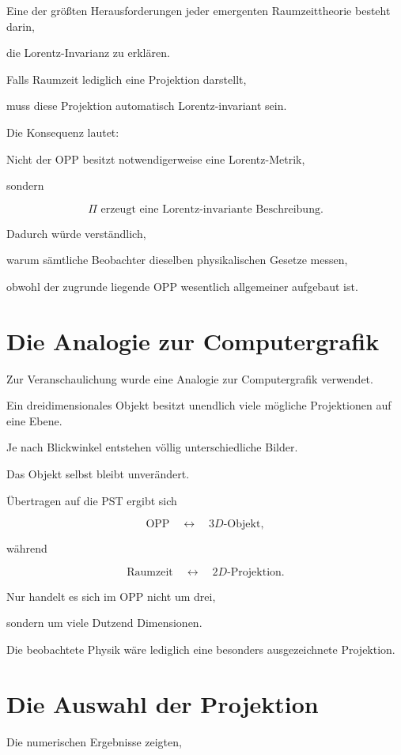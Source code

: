 Eine der größten Herausforderungen jeder emergenten Raumzeittheorie besteht darin,

die Lorentz-Invarianz zu erklären.

Falls Raumzeit lediglich eine Projektion darstellt,

muss diese Projektion automatisch Lorentz-invariant sein.

Die Konsequenz lautet:

Nicht der OPP besitzt notwendigerweise eine Lorentz-Metrik,

sondern

\[
\boxed{
\Pi
\text{ erzeugt eine Lorentz-invariante Beschreibung.}
}
\]

Dadurch würde verständlich,

warum sämtliche Beobachter dieselben physikalischen Gesetze messen,

obwohl der zugrunde liegende OPP wesentlich allgemeiner aufgebaut ist.

\section*{Die Analogie zur Computergrafik}

Zur Veranschaulichung wurde eine Analogie zur Computergrafik verwendet.

Ein dreidimensionales Objekt besitzt unendlich viele mögliche Projektionen auf eine Ebene.

Je nach Blickwinkel entstehen völlig unterschiedliche Bilder.

Das Objekt selbst bleibt unverändert.

Übertragen auf die PST ergibt sich

\[
\text{OPP}
\quad
\leftrightarrow
\quad
3D\text{-Objekt},
\]

während

\[
\text{Raumzeit}
\quad
\leftrightarrow
\quad
2D\text{-Projektion}.
\]

Nur handelt es sich im OPP nicht um drei,

sondern um viele Dutzend Dimensionen.

Die beobachtete Physik wäre lediglich eine besonders ausgezeichnete Projektion.

\section*{Die Auswahl der Projektion}

Die numerischen Ergebnisse zeigten,

